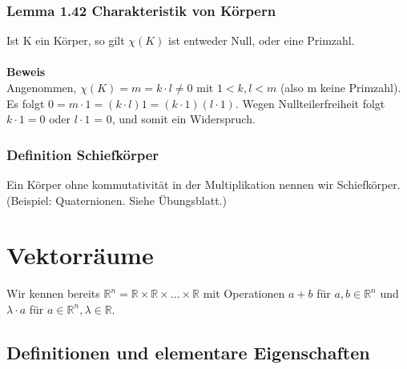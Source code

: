 \documentclass{article}
\newcommand{\lb}{\lambda}
\newcommand{\R}{\mathbb{R}}
\begin{document}
\subsubsection{Lemma 1.42 Charakteristik von Körpern}
Ist K ein Körper, so gilt $\chi(K)$ ist entweder  Null, oder eine Primzahl.\\
\\
\textbf{Beweis}\\
Angenommen, $\chi(K) = m = k \cdot l \neq 0$ mit  $1 < k, l < m$ (also m keine Primzahl). Es folgt  $0 = m \cdot 1 = (k \cdot l) 1 = (k \cdot 1)(l \cdot 1)$. Wegen Nullteilerfreiheit folgt $k \cdot 1 = 0$ oder $l \cdot 1$ = 0, und somit ein Widerspruch.

\subsubsection*{Definition Schiefkörper}
Ein Körper ohne kommutativität in der Multiplikation nennen wir Schiefkörper. (Beispiel: Quaternionen. Siehe Übungsblatt.)

\section{Vektorräume}
Wir kennen bereits  $\R^n = \R \times \R \times \dots \times \R$ mit Operationen $a + b$ für $a,b \in \R^n$ und $\lb \cdot a$ für $a \in \R^n, \lb \in \R$.

\subsection{Definitionen und elementare Eigenschaften}
\end{document}
